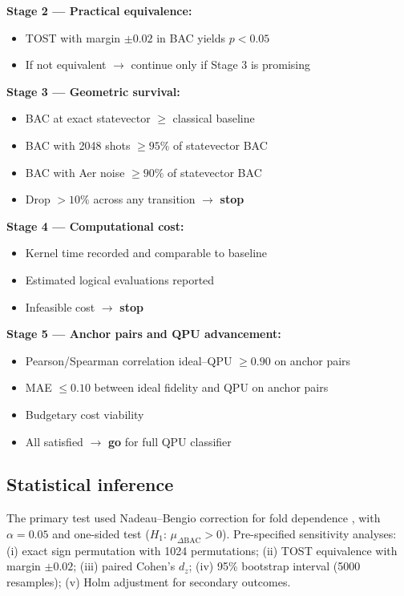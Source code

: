 \documentclass[11pt,a4paper]{article}
\newcommand{\BAC}{\mathrm{BAC}}
\begin{document}
\noindent\textbf{Stage 2 --- Practical equivalence:}
\begin{itemize}
  \item TOST with margin $\pm 0.02$ in BAC yields $p < 0.05$
  \item If not equivalent $\to$ continue only if Stage 3 is promising
\end{itemize}

\noindent\textbf{Stage 3 --- Geometric survival:}
\begin{itemize}
  \item BAC at exact statevector $\geq$ classical baseline
  \item BAC with 2048 shots $\geq 95\%$ of statevector BAC
  \item BAC with Aer noise $\geq 90\%$ of statevector BAC
  \item Drop $>10\%$ across any transition $\to$ \textbf{stop}
\end{itemize}

\noindent\textbf{Stage 4 --- Computational cost:}
\begin{itemize}
  \item Kernel time recorded and comparable to baseline
  \item Estimated logical evaluations reported
  \item Infeasible cost $\to$ \textbf{stop}
\end{itemize}

\noindent\textbf{Stage 5 --- Anchor pairs and QPU advancement:}
\begin{itemize}
  \item Pearson/Spearman correlation ideal--QPU $\geq 0.90$ on anchor pairs
  \item MAE $\leq 0.10$ between ideal fidelity and QPU on anchor pairs
  \item Budgetary cost viability
  \item All satisfied $\to$ \textbf{go} for full QPU classifier
\end{itemize}

\subsection{Statistical inference}
\label{ssec:statistics}

The primary test used Nadeau--Bengio correction for fold dependence
\citep{nadeau2003inference}, with $\alpha = 0.05$ and one-sided test ($H_1$:
$\mu_{\Delta\BAC} > 0$). Pre-specified sensitivity analyses: (i) exact sign
permutation with 1024 permutations; (ii) TOST equivalence with margin
$\pm 0.02$; (iii) paired Cohen's $d_z$; (iv) 95\% bootstrap interval (5000
resamples); (v) Holm adjustment for secondary outcomes.
\end{document}

